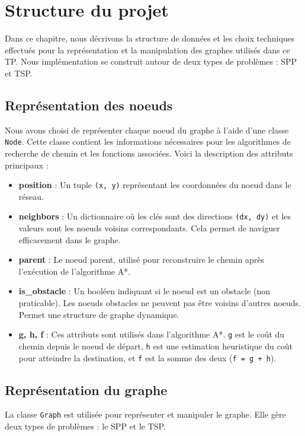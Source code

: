 \chapter{Structure du projet}
\label{chap:structure}

Dans ce chapitre, nous décrivons la structure de données et les choix techniques effectués pour la représentation et la manipulation des graphes utilisés dans ce TP. Nous implémentation se construit autour de deux types de problèmes : \ac{SPP} et \ac{TSP}.

\section{Représentation des noeuds}
Nous avons choisi de représenter chaque noeud du graphe à l'aide d'une classe \texttt{Node}. Cette classe contient les informations nécessaires pour les algorithmes de recherche de chemin et les fonctions associées. Voici la description des attributs principaux :

\begin{itemize}
    \item \textbf{position} : Un tuple \texttt{(x, y)} représentant les coordonnées du noeud dans le réseau.
    \item \textbf{neighbors} : Un dictionnaire où les clés sont des directions \texttt{(dx, dy)} et les valeurs sont les noeuds voisins correspondants. Cela permet de naviguer efficacement dans le graphe.
    \item \textbf{parent} : Le noeud parent, utilisé pour reconstruire le chemin après l'exécution de l'algorithme A*.
    \item \textbf{is\_obstacle} : Un booléen indiquant si le noeud est un obstacle (non praticable). Les noeuds obstacles ne peuvent pas être voisins d'autres noeuds. Permet une structure de graphe dynamique.
    \item \textbf{g, h, f} : Ces attributs sont utilisés dans l'algorithme A*. \texttt{g} est le coût du chemin depuis le noeud de départ, \texttt{h} est une estimation heuristique du coût pour atteindre la destination, et \texttt{f} est la somme des deux (\texttt{f = g + h}).
\end{itemize}

\section{Représentation du graphe}
La classe \texttt{Graph} est utilisée pour représenter et manipuler le graphe. Elle gère deux types de problèmes : le \ac{SPP} et le \ac{TSP}.

